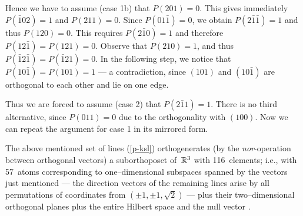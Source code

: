 \documentclass[%
  preprint,
 showpacs,
 showkeys,
 preprintnumbers,
 amsmath,amssymb,
 aps,
 rmp,
  longbibliography,
 ]{revtex4-1}
\begin{document}
Hence we have to assume (case 1b) that $P(201) = 0$.
This gives immediately
$P(\bar{1}02)=1$ and
$P(211) =0$.  Since $P(01\bar{1})=0$, we obtain $P(2\bar{1}\bar{1})=1$ and thus
$P(120)=0$.
This requires $P(2\bar{1}0)=1$ and therefore $P(12\bar{1})=P(121)=0$.
Observe that $P(210) = 1$, and thus $P(\bar{1}2\bar{1}) = P(\bar{1}21) = 0$.
In the following step, we notice that $P(10\bar{1}) =
P(101) = 1$ --- a contradiction,
since $(101)$ and $(10\bar{1})$ are
orthogonal to each other and lie on one edge.


Thus we are forced to assume (case 2) that
$P(2\bar{1}1) = 1$. There is no third alternative, since $P(011)=0$ due to the
orthogonality with $(100)$. Now we can repeat the argument for case 1 in
its mirrored form.



The above mentioned set of lines
(\ref{p-ksl})
orthogenerates (by the {\it nor}-opera\-tion between orthogonal vectors)
a suborthoposet of~${\Bbb R}^3$ with 116~elements; i.e., with 57~atoms
corresponding to one--dimensional subspaces spanned by the vectors just
mentioned --- the direction
vectors of the remaining lines arise by all permutations of coordinates
from
$(\pm 1,\pm 1,\sqrt{2})$ --- plus  their two--dimensional orthogonal
planes
plus the entire Hilbert space and the null vector
\cite{svozil-tkadlec}.
\end{document}
